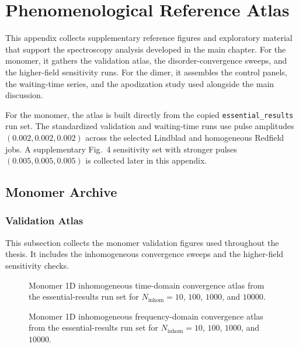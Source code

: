 \chapter{Phenomenological Reference Atlas}
\label{app:paper_eqs_reference_atlas}

This appendix collects supplementary reference figures and exploratory material that support the spectroscopy analysis developed in the main chapter. For the monomer, it gathers the validation atlas, the disorder-convergence sweeps, and the higher-field sensitivity runs. For the dimer, it assembles the control panels, the waiting-time series, and the apodization study used alongside the main discussion.

For the monomer, the atlas is built directly from the copied \texttt{essential\_results} run set. The standardized validation and waiting-time runs use pulse amplitudes $(0.002,0.002,0.002)$ across the selected Lindblad and homogeneous Redfield jobs. A supplementary Fig.~4 sensitivity set with stronger pulses $(0.005,0.005,0.005)$ is collected later in this appendix.

\section{Monomer Archive}
\label{app:sec:paper_eqs_monomer}

\subsection{Validation Atlas}

This subsection collects the monomer validation figures used throughout the thesis. It includes the inhomogeneous convergence sweeps and the higher-field sensitivity checks.

 \begin{figure}[p]
    \centering
    \caption{Monomer 1D inhomogeneous time-domain convergence atlas from the essential-results run set for $N_{\mathrm{inhom}}=10$, $100$, $1000$, and $10000$.}
    \label{fig:app_paper_eqs_monomer_fig2_time_n_dep}
\end{figure}

\begin{figure}[p]
    \centering
    \caption{Monomer 1D inhomogeneous frequency-domain convergence atlas from the essential-results run set for $N_{\mathrm{inhom}}=10$, $100$, $1000$, and $10000$.}
    \label{fig:app_paper_eqs_monomer_fig2_freq_n_dep}
\end{figure}

